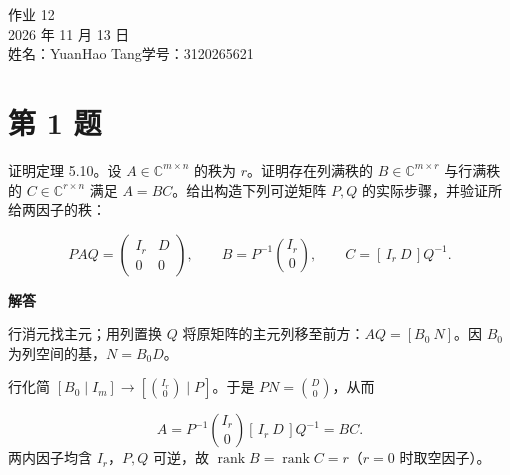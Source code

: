 \documentclass[UTF8,10pt,letterpaper,fontset=fandol]{ctexart}
\newcommand{\C}{\mathbb C}
\DeclareMathOperator{\rank}{rank}
\begin{document}
\begin{center}
{\LARGE 作业 12}\\[0.5em]
2026 年 11 月 13 日\\[0.25em]
姓名：YuanHao Tang\quad 学号：3120265621
\end{center}
\section{第 1 题}
证明定理 5.10。设 $A\in\C^{m\times n}$ 的秩为 $r$。证明存在列满秩的 $B\in\C^{m\times r}$ 与行满秩的 $C\in\C^{r\times n}$ 满足 $A=BC$。给出构造下列可逆矩阵 $P,Q$ 的实际步骤，并验证所给两因子的秩：\par
\[
 PAQ=\begin{pmatrix}I_r&D\\0&0\end{pmatrix},\qquad
 B=P^{-1}\binom{I_r}{0},\qquad C=[\,I_r\ D\,]Q^{-1}.
\]
\par{}\textbf{解答}\par
行消元找主元；用列置换 $Q$ 将原矩阵的主元列移至前方：$AQ=[B_0\ N]$。因 $B_0$ 为列空间的基，$N=B_0D$。\par
行化简 $[B_0\mid I_m]\longrightarrow[\binom{I_r}{0}\mid P]$。于是 $PN=\binom D0$，从而\par
\[
 A=P^{-1}\binom{I_r}{0}[\,I_r\ D\,]Q^{-1}=BC.
\]
两内因子均含 $I_r$，$P,Q$ 可逆，故 $\rank B=\rank C=r$（$r=0$ 时取空因子）。\par
\end{document}

